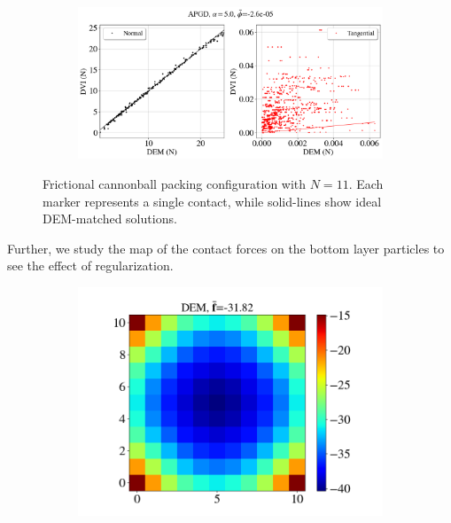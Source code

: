 \begin{itemize}
\begin{figure}[H]
		\begin{subfigure}{0.9\columnwidth}	
			\centering
			\includegraphics[width=1.0\textwidth]{images/CD/Example7/22_DVI_APGD_al_5_10par.png}
		\end{subfigure}
		\caption{Frictional cannonball packing configuration with $N=11$. Each marker represents a single contact, while solid-lines show ideal DEM-matched solutions.  }\label{fig:cbp_N=11}
	\end{figure}		
	Further, we study the map of the contact forces on the bottom layer particles to see the effect of regularization. 
	\begin{figure}[H]
		\centering	
		\begin{subfigure}{0.32\columnwidth}	
			\centering
			\includegraphics[width=1.0\textwidth]{images/CD/Example7/10/N_11_DEM_0.png}
		\end{subfigure}
		\begin{subfigure}{0.32\columnwidth}	
			\centering

\end{subfigure}
\end{figure}
\end{itemize}

